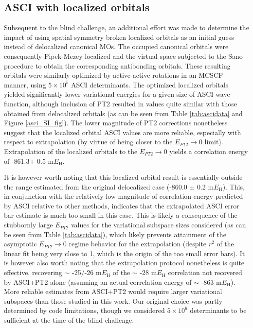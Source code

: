 \documentclass[journal=jcp,manuscript=suppinfo]{achemso}
\begin{document}
\subsection{ASCI with localized orbitals}
\label{sec:asciloc}
Subsequent to the blind challenge, an additional effort was made to determine the impact of using spatial symmetry broken localized orbitals as an initial guess instead of delocalized canonical MOs. The occupied canonical orbitals were consequently Pipek-Mezey localized\cite{pipek1989fast} and the virtual space subjected to the Sano procedure\cite{sano2000elementary} to obtain the corresponding antibonding orbitals. These resulting orbitals were similarly optimized by active-active rotations in an MCSCF manner, using $5\times 10^5$ ASCI determinants\cite{levine2020casscf}. The optimized localized orbitals yielded significantly lower variational energies for a given size of ASCI wave function, although inclusion of PT2 resulted in values quite similar with those obtained from delocalized orbitals (as can be seen from Table \ref{tab:ascidata} and  Figure \ref{asci_SI_fig}). The lower magnitude of PT2 corrections nonetheless suggest that the localized orbital ASCI values are more reliable, especially with respect to extrapolation (by virtue of being closer to the $E_{PT2}\to 0$ limit). Extrapolation of the localized orbitals to the $E_{PT2}\to 0$ yields a correlation energy of -861.3$\pm$ 0.5 m$E_{\text{H}}$. 

It is however worth noting that this localized orbital result is essentially outside the range estimated from the original delocalized case (-860.0 $\pm$ 0.2 m$E_{\text{H}}$). This, in conjunction with the relatively low magnitude of correlation energy predicted by ASCI relative to other methods, indicates that the extrapolated ASCI error bar estimate is much too small in this case. This is likely a consequence of the stubbornly large $E_{PT2}$ values for the variational subspace sizes considered (as can be seen from Table \ref{tab:ascidata}), which likely prevents attainment of the asymptotic $E_{PT2}\to 0$ regime behavior for the extrapolation (despite $r^2$ of the linear fit being very close to 1, which is the origin of the too small error bars). It is however also worth noting that the extrapolation protocol nonetheless is quite effective, recovering $\sim$ -25/-26 m$E_{\text{H}}$ of the $\sim$ -28 m$E_{\text{H}}$ correlation not recovered by ASCI+PT2 alone (assuming an actual correlation energy of $\sim$ -863 m$E_{\text{H}}$). More reliable estimates from ASCI+PT2 would require larger variational subspaces than those studied in this work. Our original choice was partly determined by code limitations, though we considered $5\times 10^6$ determinants to be sufficient at the time of the blind challenge. 
\end{document}
